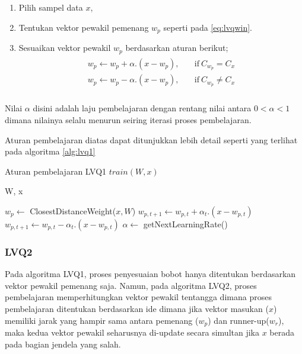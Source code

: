 \begin{enumerate}
  \setlength{\itemsep}{1pt}
  \setlength{\parskip}{0pt}
  \setlength{\parsep}{0pt}
  \item Pilih sampel data $x$,
  \item Tentukan vektor pewakil pemenang $w_p$ seperti pada \ref{eq:lvqwin}.
  \item Sesuaikan vektor pewakil $w_p$ berdasarkan aturan berikut;
  \begin{align}
  \label{eq:lvq1}
  \begin{array}{ll}
  	w_p \leftarrow w_p + \alpha . (x - w_p), &\quad \text{if}\ C_{w_p} = C_x \\
  	w_p \leftarrow w_p - \alpha . (x - w_p), &\quad \text{if}\ C_{w_p} \neq C_x
  	\\
  \end{array}
  \end{align} 
\end{enumerate}

\noindent Nilai $\alpha$ disini adalah laju pembelajaran dengan rentang nilai
antara $0 < \alpha < 1$ dimana nilainya selalu menurun seiring iterasi proses
pembelajaran.

\noindent 
Aturan pembelajaran diatas dapat ditunjukkan lebih detail seperti
yang terlihat pada algoritma \ref{alg:lvq1}
\begin{algorithm}  
\scriptsize 
\caption{Aturan pembelajaran LVQ1 $train(W, x)$}          
\label{alg:lvq1}                           
\begin{algorithmic}                    %
	\REQUIRE W, x
	
	\STATE $w_p \leftarrow $ ClosestDistanceWeight($x, W$)
		\STATE $w_{p, t+1} \leftarrow w_{p,t} + \alpha_t . (x - w_{p,t})$
		\STATE $w_{p, t+1} \leftarrow w_{p,t} - \alpha_t . (x - w_{p,t})$
	\ENDIF	
	\STATE $\alpha \leftarrow $ getNextLearningRate()
\end{algorithmic}
\end{algorithm}

\subsubsection*{LVQ2}
Pada algoritma LVQ1, proses penyesuaian bobot hanya ditentukan berdasarkan
vektor pewakil pemenang saja. Namun, pada algoritma LVQ2, proses pembelajaran
memperhitungkan vektor pewakil tentangga dimana proses pembelajaran ditentukan
berdasarkan ide dimana jika vektor masukan ($x$) memiliki jarak yang hampir sama
antara pemenang ($w_p$) dan runner-up($w_r$), maka kedua vektor pewakil seharusnya
di-update secara simultan jika $x$ berada pada bagian jendela yang salah.

